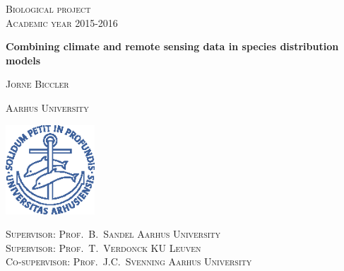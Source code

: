\documentclass[11pt,a4paper]{article}
\begin{document}
\begin{titlepage}
	\centering
	\null
    \vspace{2.5cm}
	{\scshape\Large Biological project\\ Academic year 2015-2016\par}
	\vspace{0.5cm}
	
	{\huge\bfseries Combining climate and remote sensing data in species distribution models\par}
	\vspace{2cm}
	{\scshape\LARGE Jorne Biccler}
			\vspace{1cm}	

		
	\vspace{2cm}
	{\scshape\LARGE Aarhus University \par}
		\vspace{1cm}


		\includegraphics[width=0.25\textwidth]{Segl_bla_e_PANTONE287.eps}\par
\vfill
	{\scshape\large Supervisor: Prof.\ B.\ Sandel \textcolor{blueaff}{Aarhus University}\\[5pt]
Supervisor: Prof.\ T.\ Verdonck \textcolor{blueaff}{KU Leuven}\\[5pt]
Co-supervisor: Prof.\ J.C.\ Svenning \textcolor{blueaff}{Aarhus University}\\}

\end{titlepage}
\end{document}
